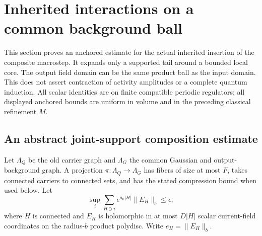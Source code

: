 \section{Inherited interactions on a common background ball}
\label{cdj-section}

This section proves an anchored estimate for the actual inherited
insertion of the composite macrostep. It expands only a supported
tail around a bounded local core. The output field domain can be
the same product ball as the input domain. This does not assert
contraction of activity amplitudes or a complete quantum induction.
All scalar identities are on finite compatible periodic regulators;
all displayed anchored bounds are uniform in volume and in the
preceding classical refinement $M$.

\subsection{An abstract joint-support composition estimate}
\label{cdj-abstract-section}

Let $\Lambda_Q$ be the old carrier graph and $\Lambda_G$ the
common Gaussian and output-background graph. A projection
$\pi:\Lambda_Q\to\Lambda_G$ has fibers of size at most $F$,
takes connected carriers to connected sets, and has the stated
compression bound when used below. Let
\begin{equation}\label{cdj-input}
 \sup_i\sum_{H\ni i}e^{a_0|H|}\|E_H\|_b\le\epsilon,
\end{equation}
where $H$ is connected and $E_H$ is holomorphic in at most
$D|H|$ scalar current-field coordinates on the radius-$b$
product polydisc. Write $e_H=\|E_H\|_b$.

